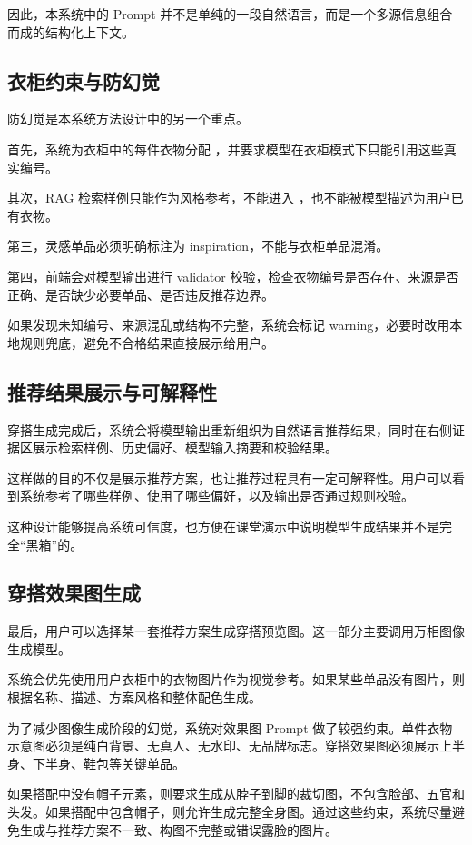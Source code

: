 \documentclass{applemlr}
\begin{document}
因此，本系统中的 Prompt 并不是单纯的一段自然语言，而是一个多源信息组合而成的结构化上下文。

\subsection{衣柜约束与防幻觉}

防幻觉是本系统方法设计中的另一个重点。

首先，系统为衣柜中的每件衣物分配 ，并要求模型在衣柜模式下只能引用这些真实编号。

其次，RAG 检索样例只能作为风格参考，不能进入 ，也不能被模型描述为用户已有衣物。

第三，灵感单品必须明确标注为 inspiration，不能与衣柜单品混淆。

第四，前端会对模型输出进行 validator 校验，检查衣物编号是否存在、来源是否正确、是否缺少必要单品、是否违反推荐边界。

如果发现未知编号、来源混乱或结构不完整，系统会标记 warning，必要时改用本地规则兜底，避免不合格结果直接展示给用户。

\subsection{推荐结果展示与可解释性}

穿搭生成完成后，系统会将模型输出重新组织为自然语言推荐结果，同时在右侧证据区展示检索样例、历史偏好、模型输入摘要和校验结果。

这样做的目的不仅是展示推荐方案，也让推荐过程具有一定可解释性。用户可以看到系统参考了哪些样例、使用了哪些偏好，以及输出是否通过规则校验。

这种设计能够提高系统可信度，也方便在课堂演示中说明模型生成结果并不是完全“黑箱”的。

\subsection{穿搭效果图生成}

最后，用户可以选择某一套推荐方案生成穿搭预览图。这一部分主要调用万相图像生成模型。

系统会优先使用用户衣柜中的衣物图片作为视觉参考。如果某些单品没有图片，则根据名称、描述、方案风格和整体配色生成。

为了减少图像生成阶段的幻觉，系统对效果图 Prompt 做了较强约束。单件衣物示意图必须是纯白背景、无真人、无水印、无品牌标志。穿搭效果图必须展示上半身、下半身、鞋包等关键单品。

如果搭配中没有帽子元素，则要求生成从脖子到脚的裁切图，不包含脸部、五官和头发。如果搭配中包含帽子，则允许生成完整全身图。通过这些约束，系统尽量避免生成与推荐方案不一致、构图不完整或错误露脸的图片。
\end{document}
